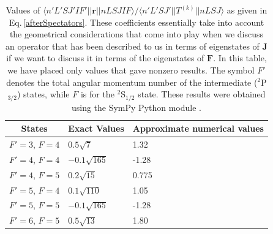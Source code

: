 \begin{table}[h!]
\centering
\begin{tabular}{|c|l|l|}
\hline
States & Exact Values & Approximate numerical values\\
\hline
$F'=3$, $F=4$&$0.5 \sqrt{7}$&1.32\\ 
$F'=4$, $F=4$&$- 0.1 \sqrt{165}$&-1.28\\ 
$F'=4$, $F=5$&$0.2 \sqrt{15}$&0.775\\ 
$F'=5$, $F=4$&$0.1 \sqrt{110}$&1.05\\ 
$F'=5$, $F=5$&$- 0.1 \sqrt{165}$&-1.28\\ 
$F'=6$, $F=5$&$0.5 \sqrt{13}$&1.80\\ 
\hline
\end{tabular}
\caption{Values of $\langle n' L' S J' I F' ||\mathbf{r}||n L S J I F\rangle / \langle n'L' S J'||T^{(k)}|| n L S J\rangle$ as given in Eq.\,\ref{afterSpectators}. These coefficients essentially take into account the geometrical considerations that come into play when we discuss an operator that has been described to us in terms of eigenstates of $\mathbf{J}$ if we want to discuss it in terms of the eigenstates of $\mathbf{F}$. In this table, we have placed only values that gave nonzero results. The symbol $F'$ denotes the total angular momentum number of the intermediate ($^2$P$_{3/2}$) states, while $F$ is for the $^2$S$_{1/2}$ state. These results were obtained using the SymPy Python module \cite{sympy}\cite{rasch6j}.
\label{coefficient_calculated}}
\end{table}

